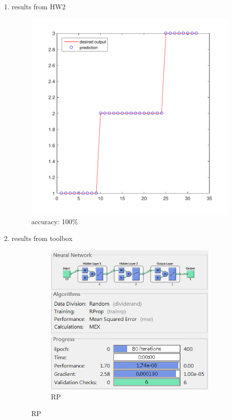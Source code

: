 \documentclass[12pt,a4paper]{article}
\begin{document}
\begin{CJK}{UTF8}{bsmi}
\begin{enumerate}
\begin{enumerate}
	 	\item results from HW2 
	 	\\
	 	\begin{figure}[H]
	 		\centering
	 		\includegraphics[scale=0.6]{winehs1}
	 		\caption{accuracy: 100\%} 
	 	\end{figure}
	 	\newpage
	 	\item results from toolbox 
	 	\\
	 	
	 	\begin{figure}[H]
	 		\centering
	 		\begin{subfigure}{.5\textwidth}
	 			\centering
	 			\includegraphics[width=0.92\linewidth]{RP2}
	 			\caption{RP}
	 			

\end{subfigure}
\end{figure}
\end{enumerate}
\end{enumerate}
\end{CJK}
\end{document}
